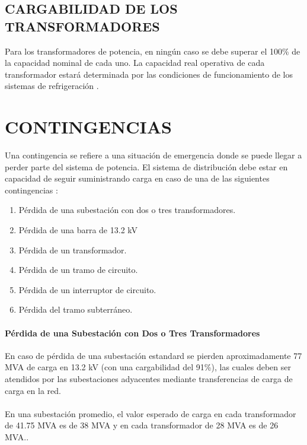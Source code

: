 \documentclass[a5paper]{book}%
\begin{document}
\section{CARGABILIDAD DE LOS TRANSFORMADORES}

Para los transformadores de potencia, en ningún caso se debe superar el 100\% de la capacidad nominal de cada uno. La capacidad real operativa de cada transformador estará determinada por las condiciones
de funcionamiento de los sistemas de refrigeración \cite{MANOPEMCALI}.

\chapter{CONTINGENCIAS}


Una contingencia se refiere a una situación de emergencia donde se puede llegar a perder parte del sistema de potencia. El sistema de distribución debe estar en capacidad de seguir suministrando carga en caso de una de las siguientes contingencias \cite{EMCALI2007}:

\begin{enumerate}
	\item Pérdida de una subestación con dos o tres transformadores.
	\item Pérdida de una barra de 13.2 kV
	\item Pérdida de un transformador.
	\item Pérdida de un tramo de circuito.
	\item Pérdida de un interruptor de circuito.
	\item Pérdida del tramo subterráneo.
\end{enumerate}

\subsubsection{Pérdida de una Subestación con Dos o Tres Transformadores}

En caso de pérdida de una subestación estandard se pierden
aproximadamente 77 MVA de carga en 13.2 kV (con una cargabilidad del 91\%), las cuales deben ser atendidos por las subestaciones adyacentes mediante transferencias de carga  de carga en la red.\\\\
 En una subestación promedio, el valor esperado de carga en cada transformador de 41.75 MVA es de 38 MVA y en cada transformador de 28 MVA es de 26 MVA.\cite{EMCALI2007}.\\\\
\end{document}
